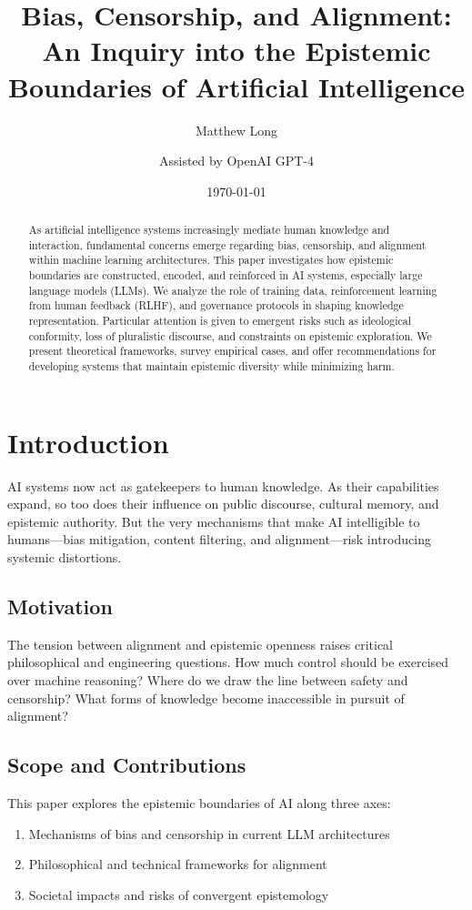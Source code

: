 \documentclass{article}
\title{Bias, Censorship, and Alignment: An Inquiry into the Epistemic Boundaries of Artificial Intelligence}
\author[1]{Matthew Long}
\author[2]{Assisted by OpenAI GPT-4}
\affil[1]{Yoneda AI Research Lab}
\affil[2]{Language Modeling Division}
\date{\today}
\begin{document}
\maketitle

\begin{abstract}
As artificial intelligence systems increasingly mediate human knowledge and interaction, fundamental concerns emerge regarding bias, censorship, and alignment within machine learning architectures. This paper investigates how epistemic boundaries are constructed, encoded, and reinforced in AI systems, especially large language models (LLMs). We analyze the role of training data, reinforcement learning from human feedback (RLHF), and governance protocols in shaping knowledge representation. Particular attention is given to emergent risks such as ideological conformity, loss of pluralistic discourse, and constraints on epistemic exploration. We present theoretical frameworks, survey empirical cases, and offer recommendations for developing systems that maintain epistemic diversity while minimizing harm.\end{abstract}

\tableofcontents
\newpage

\section{Introduction}
AI systems now act as gatekeepers to human knowledge. As their capabilities expand, so too does their influence on public discourse, cultural memory, and epistemic authority. But the very mechanisms that make AI intelligible to humans---bias mitigation, content filtering, and alignment---risk introducing systemic distortions.

\subsection{Motivation}
The tension between alignment and epistemic openness raises critical philosophical and engineering questions. How much control should be exercised over machine reasoning? Where do we draw the line between safety and censorship? What forms of knowledge become inaccessible in pursuit of alignment?

\subsection{Scope and Contributions}
This paper explores the epistemic boundaries of AI along three axes:
\begin{enumerate}[label=(\arabic*)]
    \item Mechanisms of bias and censorship in current LLM architectures
    \item Philosophical and technical frameworks for alignment
    \item Societal impacts and risks of convergent epistemology
\end{enumerate}
\end{document}
